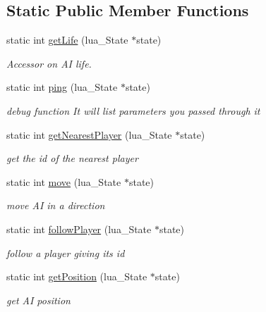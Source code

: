 \subsection*{Static Public Member Functions}
\begin{DoxyCompactItemize}
\item 
\mbox{\label{classIA_a1d8f2d91effd6eab9610763bb324d8cd}} 
static int \hyperlink{classIA_a1d8f2d91effd6eab9610763bb324d8cd}{get\+Life} (lua\+\_\+\+State $\ast$state)
\begin{DoxyCompactList}\small\item\em Accessor on AI life. \end{DoxyCompactList}\item 
\mbox{\label{classIA_af8df32744539390d12d6748f0edf0311}} 
static int \hyperlink{classIA_af8df32744539390d12d6748f0edf0311}{ping} (lua\+\_\+\+State $\ast$state)
\begin{DoxyCompactList}\small\item\em debug function It will list parameters you passed through it \end{DoxyCompactList}\item 
\mbox{\label{classIA_a2ed64a5d1cf26fba609bf2208622957c}} 
static int \hyperlink{classIA_a2ed64a5d1cf26fba609bf2208622957c}{get\+Nearest\+Player} (lua\+\_\+\+State $\ast$state)
\begin{DoxyCompactList}\small\item\em get the id of the nearest player \end{DoxyCompactList}\item 
\mbox{\label{classIA_a23d578bd33cd4260b9381116d5979c2e}} 
static int \hyperlink{classIA_a23d578bd33cd4260b9381116d5979c2e}{move} (lua\+\_\+\+State $\ast$state)
\begin{DoxyCompactList}\small\item\em move AI in a direction \end{DoxyCompactList}\item 
\mbox{\label{classIA_a7b69140525af0e287742977cd803927f}} 
static int \hyperlink{classIA_a7b69140525af0e287742977cd803927f}{follow\+Player} (lua\+\_\+\+State $\ast$state)
\begin{DoxyCompactList}\small\item\em follow a player giving its id \end{DoxyCompactList}\item 
\mbox{\label{classIA_a528b38ddf9f67ec6d226969360adab46}} 
static int \hyperlink{classIA_a528b38ddf9f67ec6d226969360adab46}{get\+Position} (lua\+\_\+\+State $\ast$state)
\begin{DoxyCompactList}\small\item\em get AI position \end{DoxyCompactList}\end{DoxyCompactItemize}


